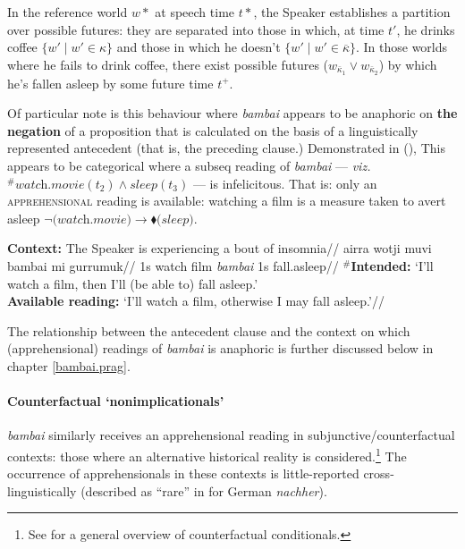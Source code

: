 In the reference world $w*$ at speech time $t*$, the Speaker establishes a partition over possible futures: they are separated into those in which, at time $ t' $, he drinks coffee $ \{w'\mid w'\in\kappa \} $ and those in which he doesn't $ \{w'\mid w'\in\overline\kappa \} $. In those worlds where he fails to drink coffee, there exist possible futures ($w_{\bar\kappa_1}\vee w_{\bar\kappa_2}$) by which he's fallen asleep by some future time $t^+$.
\xe

Of particular note is this behaviour where \textit{bambai} appears to be anaphoric on \textbf{the negation} of a proposition that is calculated on the basis of a linguistically represented antecedent (that is, the preceding clause.) Demonstrated in (), This appears to be categorical where a {\sc subseq} reading of \textit{bambai} --- \textit{viz.} $^\# \textit{watch.movie}(t_2) \wedge \textit{sleep}(t_3) $ --- is infelicitous. That is: only an \textsc{apprehensional} reading is available: watching a film is a measure taken to avert asleep $ \boldsymbol\neg\textit{(watch.movie)}\to\blacklozenge \textit{(sleep)} $.

\pex
\begingl\glpreamble\textbf{Context:} The Speaker is experiencing a bout of insomnia//
\gla\ljudge{$^\#$}airra wotji muvi bambai mi gurrumuk//
\glb 1s watch film \textit{bambai} 1s fall.asleep//
\glft $ ^\# $\textbf{Intended:} `I'll watch a film, then I'll (be able to) fall asleep.'\\
\textbf{Available reading:} `I'll watch a film, otherwise I may fall asleep.'\trailingcitation{[AJ~23022017]}//
\endgl\xe

The relationship between the antecedent clause and the context on which (apprehensional) readings of \textit{bambai} is anaphoric is further discussed below in chapter \ref{bambai.prag}.
\paragraph{Counterfactual `nonimplicationals'}

\textit{bambai} similarly receives an apprehensional reading in subjunctive/counterfactual contexts: those where an alternative historical reality is considered.\footnote{See \citealp{VonFintel2012} for a general overview of counterfactual conditionals.} The occurrence of apprehensionals in these contexts is little-reported cross-linguistically (described as ``rare'' in \citealp{Angelo2018} for German \textit{nachher}).



